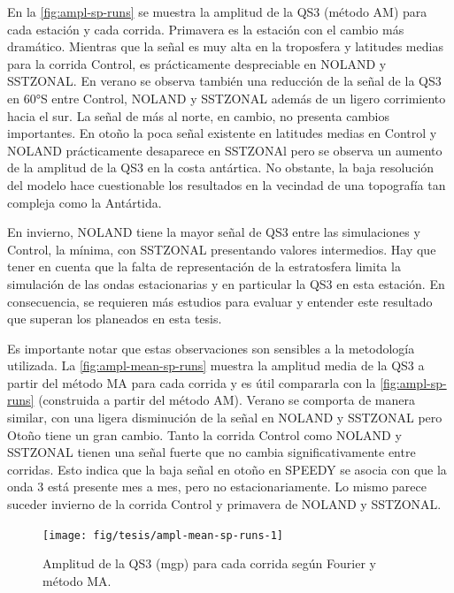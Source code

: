 \documentclass[spanish,a4paper,12pt,oneside]{book}
\begin{document}
En la \autoref{fig:ampl-sp-runs} se muestra la amplitud de la QS3
(método AM) para cada estación y cada corrida. Primavera es la estación
con el cambio más dramático. Mientras que la señal es muy alta en la
troposfera y latitudes medias para la corrida Control, es prácticamente
despreciable en NOLAND y SSTZONAL. En verano se observa también una
reducción de la señal de la QS3 en 60°S entre Control, NOLAND y SSTZONAL
además de un ligero corrimiento hacia el sur. La señal de más al norte,
en cambio, no presenta cambios importantes. En otoño la poca señal
existente en latitudes medias en Control y NOLAND prácticamente
desaparece en SSTZONAl pero se observa un aumento de la amplitud de la
QS3 en la costa antártica. No obstante, la baja resolución del modelo
hace cuestionable los resultados en la vecindad de una topografía tan
compleja como la Antártida.

En invierno, NOLAND tiene la mayor señal de QS3 entre las simulaciones y
Control, la mínima, con SSTZONAL presentando valores intermedios. Hay
que tener en cuenta que la falta de representación de la estratosfera
limita la simulación de las ondas estacionarias y en particular la QS3
en esta estación. En consecuencia, se requieren más estudios para
evaluar y entender este resultado que superan los planeados en esta
tesis.

Es importante notar que estas observaciones son sensibles a la
metodología utilizada. La \autoref{fig:ampl-mean-sp-runs} muestra la
amplitud media de la QS3 a partir del método MA para cada corrida y es
útil compararla con la \autoref{fig:ampl-sp-runs} (construida a partir
del método AM). Verano se comporta de manera similar, con una ligera
disminución de la señal en NOLAND y SSTZONAL pero Otoño tiene un gran
cambio. Tanto la corrida Control como NOLAND y SSTZONAL tienen una señal
fuerte que no cambia significativamente entre corridas. Esto indica que
la baja señal en otoño en SPEEDY se asocia con que la onda 3 está
presente mes a mes, pero no estacionariamente. Lo mismo parece suceder
invierno de la corrida Control y primavera de NOLAND y SSTZONAL.

\begin{landscape}\begin{figure}

{\centering \texttt{[image: fig/tesis/ampl-mean-sp-runs-1]} 

}

\caption{Amplitud de la QS3 (mgp) para cada corrida según Fourier y método MA.}\label{fig:ampl-mean-sp-runs}
\end{figure}
\end{landscape}
\end{document}
